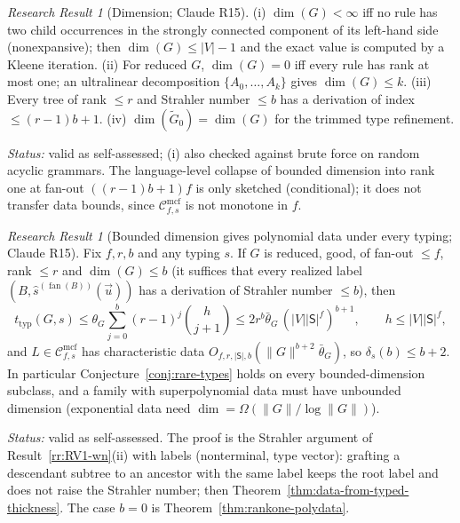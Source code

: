 \documentclass[11pt]{article}
\numberwithin{equation}{section}
\theoremstyle{plain}
\theoremstyle{definition}
\theoremstyle{remark}
\newtheorem{rresult}[theorem]{Research Result}
\newcommand{\Cmcf}[2]{\mathcal{C}^{\mathrm{mcf}}_{#1,#2}}
\newcommand{\tuple}[1]{\vec{#1}}
\newcommand{\fan}{\operatorname{fan}}
\theoremstyle{plain}
\begin{document}
\begin{rresult}[Dimension; Claude R15]
\label{rr:R15-dimension}
(i) $\dim(G)<\infty$ iff no rule has two child occurrences in the strongly connected component of its
left-hand side (nonexpansive); then $\dim(G)\le|V|-1$ and the exact value is computed by a Kleene
iteration.  (ii) For reduced $G$, $\dim(G)=0$ iff every rule has rank at most one; an ultralinear
decomposition $\{A_0,\ldots,A_k\}$ \cite[p.~438]{GinsburgSpanier1966} gives $\dim(G)\le k$.
(iii) Every tree of rank $\le r$ and Strahler number $\le b$ has a derivation of index $\le(r-1)b+1$.
(iv) $\dim(\widetilde G_0)=\dim(G)$ for the trimmed type refinement.
\end{rresult}
\noindent\emph{Status:} valid as self-assessed; (i) also checked against brute force on random acyclic
grammars.  The language-level collapse of bounded dimension into rank one at fan-out $((r-1)b+1)f$ is
only sketched (conditional); it does not transfer data bounds, since $\Cmcf{f}{s}$ is not monotone in $f$.

\begin{rresult}[Bounded dimension gives polynomial data under every typing; Claude R15]
\label{rr:R15-upper}
Fix $f,r,b$ and any typing $s$.  If $G$ is reduced, good, of fan-out $\le f$, rank $\le r$ and
$\dim(G)\le b$ (it suffices that every realized label $(B,\widehat s^{(\fan(B))}(\tuple u))$ has a
derivation of Strahler number $\le b$), then
\[
 t_{\mathrm{typ}}(G,s)\le\theta_G\sum_{j=0}^b(r-1)^j\binom{h}{j+1}\le2r^b\bar\theta_G\,(|V||\mathsf S|^f)^{b+1},
 \qquad h\le|V||\mathsf S|^f,
\]
and $L\in\Cmcf{f}{s}$ has characteristic data $O_{f,r,|\mathsf S|,b}(\|G\|^{b+2}\bar\theta_G)$, so
$\delta_s(b)\le b+2$.  In particular Conjecture~\ref{conj:rare-types} holds on every bounded-dimension
subclass, and a family with superpolynomial data must have unbounded dimension (exponential data
need $\dim=\Omega(\|G\|/\log\|G\|)$).
\end{rresult}
\noindent\emph{Status:} valid as self-assessed.  The proof is the Strahler argument of
Result~\ref{rr:RV1-wn}(ii) with labels (nonterminal, type vector): grafting a descendant subtree to an
ancestor with the same label keeps the root label and does not raise the Strahler number; then
Theorem~\ref{thm:data-from-typed-thickness}.  The case $b=0$ is Theorem~\ref{thm:rankone-polydata}.
\end{document}
